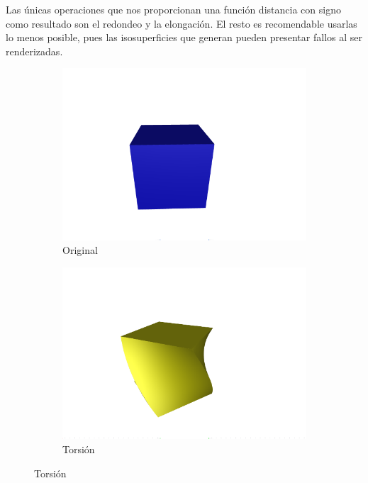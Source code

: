 Las únicas operaciones que nos proporcionan una función distancia con signo como resultado son el redondeo y la elongación. El resto es recomendable usarlas lo menos posible, pues las isosuperficies que generan pueden presentar fallos al ser renderizadas.
\begin{figure}[ht!]
    \centering
    \begin{subfigure}[b]{0.30\textwidth}
        \centering
        \includegraphics[width=\textwidth]{Plantilla-TFG-master/img/deform_og.png}
        \caption{Original}
    \end{subfigure}
    \hfill
    \begin{subfigure}[b]{0.30\textwidth}
        \centering
        \includegraphics[width=\textwidth]{Plantilla-TFG-master/img/deform_twist.png}
        \caption{Torsión}
    \end{subfigure}

\end{figure}
